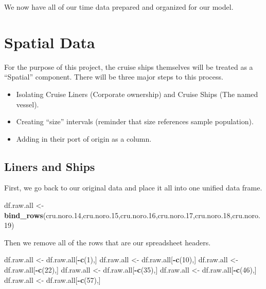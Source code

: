 \documentclass[
  11,
]{book}
\newenvironment{Shaded}{\begin{snugshade}}{\end{snugshade}}
\newcommand{\DecValTok}[1]{\textcolor[rgb]{0.06,0.06,0.06}{#1}}
\newcommand{\FloatTok}[1]{\textcolor[rgb]{0.06,0.06,0.06}{#1}}
\newcommand{\FunctionTok}[1]{\textcolor[rgb]{0.27,0.27,0.27}{\textbf{#1}}}
\newcommand{\NormalTok}[1]{#1}
\newcommand{\OtherTok}[1]{\textcolor[rgb]{0.37,0.37,0.37}{#1}}
\newcommand{\SpecialCharTok}[1]{\textcolor[rgb]{0.43,0.43,0.43}{\textbf{#1}}}
\providecommand{\tightlist}{%
  \setlength{\itemsep}{0pt}\setlength{\parskip}{0pt}}
\begin{document}
We now have all of our time data prepared and organized for our model.

\hypertarget{spatial-data}{%
\section*{Spatial Data}\label{spatial-data}}


For the purpose of this project, the cruise ships themselves will be treated as a ``Spatial'' component. There will be three major steps to this process.

\begin{itemize}
\tightlist
\item
  Isolating Cruise Liners (Corporate ownership) and Cruise Ships (The named vessel).
\item
  Creating ``size'' intervals (reminder that size references sample population).
\item
  Adding in their port of origin as a column.
\end{itemize}

\hypertarget{liners-and-ships}{%
\subsection*{Liners and Ships}\label{liners-and-ships}}


First, we go back to our original data and place it all into one unified data frame.

\begin{Shaded}
\begin{Highlighting}[]
\NormalTok{df.raw.all }\OtherTok{\textless{}{-}} \FunctionTok{bind\_rows}\NormalTok{(cru.noro}\FloatTok{.14}\NormalTok{,cru.noro}\FloatTok{.15}\NormalTok{,cru.noro}\FloatTok{.16}\NormalTok{,cru.noro}\FloatTok{.17}\NormalTok{,cru.noro}\FloatTok{.18}\NormalTok{,cru.noro}\FloatTok{.19}\NormalTok{)}
\end{Highlighting}
\end{Shaded}

Then we remove all of the rows that are our spreadsheet headers.

\begin{Shaded}
\begin{Highlighting}[]
\NormalTok{df.raw.all }\OtherTok{\textless{}{-}}\NormalTok{ df.raw.all[}\SpecialCharTok{{-}}\FunctionTok{c}\NormalTok{(}\DecValTok{1}\NormalTok{),]}
\NormalTok{df.raw.all }\OtherTok{\textless{}{-}}\NormalTok{ df.raw.all[}\SpecialCharTok{{-}}\FunctionTok{c}\NormalTok{(}\DecValTok{10}\NormalTok{),]}
\NormalTok{df.raw.all }\OtherTok{\textless{}{-}}\NormalTok{ df.raw.all[}\SpecialCharTok{{-}}\FunctionTok{c}\NormalTok{(}\DecValTok{22}\NormalTok{),]}
\NormalTok{df.raw.all }\OtherTok{\textless{}{-}}\NormalTok{ df.raw.all[}\SpecialCharTok{{-}}\FunctionTok{c}\NormalTok{(}\DecValTok{35}\NormalTok{),]}
\NormalTok{df.raw.all }\OtherTok{\textless{}{-}}\NormalTok{ df.raw.all[}\SpecialCharTok{{-}}\FunctionTok{c}\NormalTok{(}\DecValTok{46}\NormalTok{),]}
\NormalTok{df.raw.all }\OtherTok{\textless{}{-}}\NormalTok{ df.raw.all[}\SpecialCharTok{{-}}\FunctionTok{c}\NormalTok{(}\DecValTok{57}\NormalTok{),]}
\end{Highlighting}
\end{Shaded}
\end{document}
